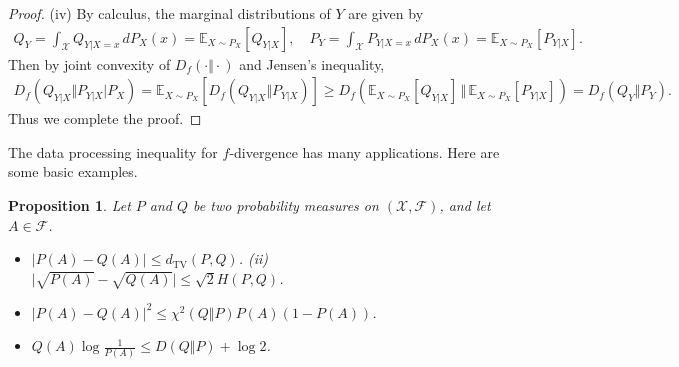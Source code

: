 \documentclass{article}
\numberwithin{equation}{section}
\newcommand{\E}{\mathbb{E}}
\renewcommand{\cal}{\mathcal}
\theoremstyle{plain}
\newtheorem{proposition}[theorem]{Proposition}
\theoremstyle{definition}
\begin{document}
\begin{proof}
(iv) By calculus, the marginal distributions of $Y$ are given by
\begin{align*}
	Q_Y=\int_{\cal{X}} Q_{Y|X=x}\,dP_X(x)=\E_{X\sim P_X}[Q_{Y|X}],\quad P_Y=\int_{\cal{X}} P_{Y|X=x}\,dP_X(x)=\E_{X\sim P_X}[P_{Y|X}].
\end{align*}
Then by joint convexity of $D_f(\cdot\Vert\cdot)$ and Jensen's inequality,
\begin{align*}
	D_f(Q_{Y|X}\Vert P_{Y|X}|P_X)=\mathbb{E}_{X\sim P_X}\left[D_f(Q_{Y|X}\Vert P_{Y|X})\right]\geq D_f\left(\mathbb{E}_{X\sim P_X}[Q_{Y|X}]\,\Vert\,\mathbb{E}_{X\sim P_X}[P_{Y|X}]\right)=D_f(Q_Y\Vert P_Y).
\end{align*}
Thus we complete the proof.
\end{proof}
The data processing inequality for $f$-divergence has many applications. Here are some basic examples.
\begin{proposition}\label{dataproconseq}
Let $P$ and $Q$ be two probability measures on $(\cal{X},\mathscr{F})$, and let $A\in\mathscr{F}$.
\begin{itemize}
\item[(i)] $\vert P(A)-Q(A)\vert\leq d_\mathrm{TV}(P,Q)$. \quad (ii) $\vert\sqrt{P(A)}-\sqrt{Q(A)}\vert\leq\sqrt{2}H(P,Q)$.
\item[(iii)] $\vert P(A)-Q(A)\vert^2\leq\chi^2(Q\Vert P)P(A)(1-P(A))$.
\item[(iv)] $Q(A)\log\frac{1}{P(A)}\leq D(Q\Vert P)+\log 2$.
\end{itemize}
\end{proposition}
\end{document}

